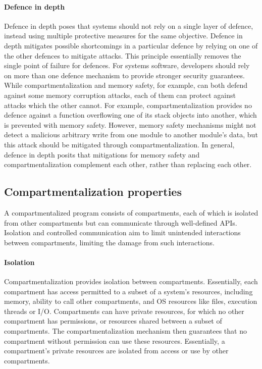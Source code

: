 \paragraph{Defence in depth}
Defence in depth poses that systems should not rely on a single layer of
defence, instead using multiple protective measures for the same objective.
Defence in depth mitigates possible shortcomings in a particular defence by
relying on one of the other defences to mitigate attacks.
This principle essentially removes the single point of failure for defences.
For systems software, developers should rely on more than one defence
mechanism to provide stronger security guarantees.
While compartmentalization and memory safety, for example, can both defend
against some memory corruption attacks, each of them can protect against
attacks which the other cannot.
For example, compartmentalization provides no defence against a function
overflowing one of its stack objects into another, which is prevented with
memory safety.
However, memory safety mechanisms might not detect a malicious arbitrary
write from one module to another module's data, but this attack should be
mitigated through compartmentalization.
In general, defence in depth posits that mitigations for memory safety and
compartmentalization complement each other, rather than replacing each other.

\subsection{Compartmentalization properties}
\label{sec:seccells:background:properties}
A compartmentalized program consists of compartments, each of which is
isolated from other compartments but can communicate through well-defined
APIs.
Isolation and controlled communication aim to limit unintended interactions
between compartments, limiting the damage from such interactions.

\paragraph{Isolation}
Compartmentalization provides isolation between compartments. 
Essentially, each compartment has access permitted to a subset of a system's
resources, including memory, ability to call other compartments, and 
OS resources like files, execution threads or I/O.
Compartments can have private resources, for which no other compartment has
permissions, or resources shared between a subset of compartments.
The compartmentalization mechanism then guarantees that no compartment
without permission can use these resources.
Essentially, a compartment's private resources are isolated from access or
use by other compartments.

